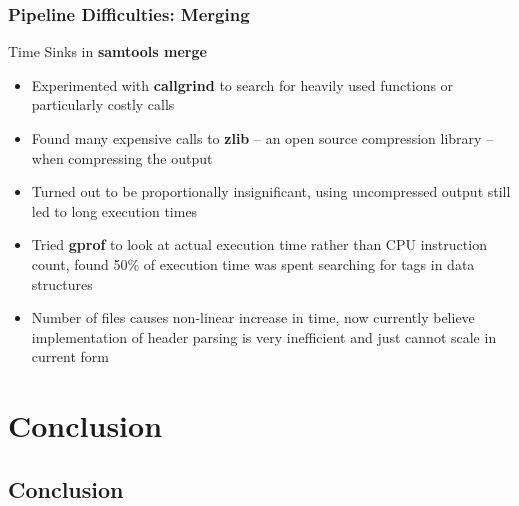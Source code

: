 \documentclass{beamer}
\begin{document}
\begin{frame}[t]
\frametitle{Pipeline Difficulties: Merging}
    \begin{beamerboxesrounded}[shadow=true]{}
        \begin{center}
            Time Sinks in \textbf{samtools merge}
        \end{center}
    \end{beamerboxesrounded}
    \begin{itemize}
        \item Experimented with \textbf{callgrind} to search for heavily used
            functions or particularly costly calls
        \item Found many expensive calls to \textbf{zlib} -- an open source
            compression library -- when compressing the output
        \item Turned out to be proportionally insignificant, using uncompressed output
            still led to long execution times
        \item Tried \textbf{gprof} to look at actual execution time rather than
            CPU instruction count, found 50\% of execution time was spent searching
            for tags in data structures
        \item Number of files causes non-linear increase in time,
            now currently believe implementation of header parsing is very inefficient
            and just cannot scale in current form
    \end{itemize}
\end{frame}


\section{Conclusion}
\subsection{Conclusion}
\end{document}
